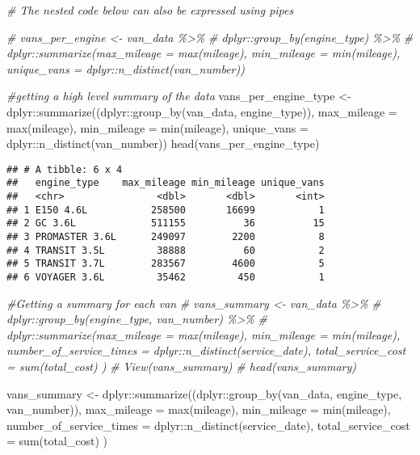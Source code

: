 \documentclass[
]{article}
\newenvironment{Shaded}{\begin{snugshade}}{\end{snugshade}}
\newcommand{\AttributeTok}[1]{\textcolor[rgb]{0.77,0.63,0.00}{#1}}
\newcommand{\CommentTok}[1]{\textcolor[rgb]{0.56,0.35,0.01}{\textit{#1}}}
\newcommand{\FunctionTok}[1]{\textcolor[rgb]{0.00,0.00,0.00}{#1}}
\newcommand{\NormalTok}[1]{#1}
\newcommand{\OtherTok}[1]{\textcolor[rgb]{0.56,0.35,0.01}{#1}}
\newcommand{\SpecialCharTok}[1]{\textcolor[rgb]{0.00,0.00,0.00}{#1}}
\begin{document}
\begin{Shaded}
\begin{Highlighting}[]
\CommentTok{\# The nested code below can also be expressed using pipes}

\CommentTok{\# vans\_per\_engine \textless{}{-} van\_data \%\textgreater{}\% }
\CommentTok{\#   dplyr::group\_by(engine\_type) \%\textgreater{}\% }
\CommentTok{\#   dplyr::summarize(max\_mileage = max(mileage), min\_mileage = min(mileage), unique\_vans = dplyr::n\_distinct(van\_number))}

\CommentTok{\#getting a high level summary of the data}
\NormalTok{vans\_per\_engine\_type }\OtherTok{\textless{}{-}}\NormalTok{ dplyr}\SpecialCharTok{::}\FunctionTok{summarize}\NormalTok{((dplyr}\SpecialCharTok{::}\FunctionTok{group\_by}\NormalTok{(van\_data, engine\_type)), }\AttributeTok{max\_mileage =} \FunctionTok{max}\NormalTok{(mileage), }\AttributeTok{min\_mileage =} \FunctionTok{min}\NormalTok{(mileage), }\AttributeTok{unique\_vans =}\NormalTok{ dplyr}\SpecialCharTok{::}\FunctionTok{n\_distinct}\NormalTok{(van\_number))}
\FunctionTok{head}\NormalTok{(vans\_per\_engine\_type)}
\end{Highlighting}
\end{Shaded}

\begin{verbatim}
## # A tibble: 6 x 4
##   engine_type    max_mileage min_mileage unique_vans
##   <chr>                <dbl>       <dbl>       <int>
## 1 E150 4.6L           258500       16699           1
## 2 GC 3.6L             511155          36          15
## 3 PROMASTER 3.6L      249097        2200           8
## 4 TRANSIT 3.5L         38888          60           2
## 5 TRANSIT 3.7L        283567        4600           5
## 6 VOYAGER 3.6L         35462         450           1
\end{verbatim}

\begin{Shaded}
\begin{Highlighting}[]
\CommentTok{\#Getting a summary for each van}
\CommentTok{\# vans\_summary \textless{}{-} van\_data \%\textgreater{}\% }
\CommentTok{\#   dplyr::group\_by(engine\_type, van\_number) \%\textgreater{}\% }
\CommentTok{\#   dplyr::summarize(max\_mileage = max(mileage), min\_mileage = min(mileage), number\_of\_service\_times = dplyr::n\_distinct(service\_date), total\_service\_cost = sum(total\_cost) )}
\CommentTok{\# View(vans\_summary)}
\CommentTok{\# head(vans\_summary)}

\NormalTok{vans\_summary }\OtherTok{\textless{}{-}}\NormalTok{ dplyr}\SpecialCharTok{::}\FunctionTok{summarize}\NormalTok{((dplyr}\SpecialCharTok{::}\FunctionTok{group\_by}\NormalTok{(van\_data, engine\_type, van\_number)), }\AttributeTok{max\_mileage =} \FunctionTok{max}\NormalTok{(mileage), }\AttributeTok{min\_mileage =} \FunctionTok{min}\NormalTok{(mileage), }\AttributeTok{number\_of\_service\_times =}\NormalTok{ dplyr}\SpecialCharTok{::}\FunctionTok{n\_distinct}\NormalTok{(service\_date), }\AttributeTok{total\_service\_cost =} \FunctionTok{sum}\NormalTok{(total\_cost) )}
\end{Highlighting}
\end{Shaded}
\end{document}
